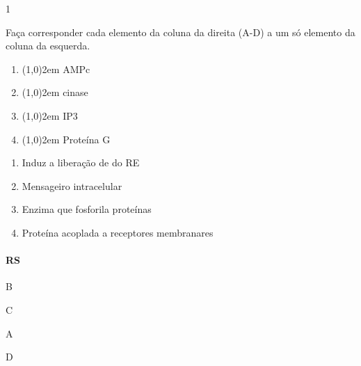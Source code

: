 \documentclass[\mainfilename]{subfiles}
\begin{document}
\begin{questionBox}1{} %
    
    Faça corresponder cada elemento da coluna da direita (A-D) a um só elemento da coluna da esquerda.

    \begin{multicols}{2}
       \begin{minipage}{.4\textwidth}
            \begin{enumerate}[label=(\roman{enumi})]
                \item \line(1,0){2em}{} AMPc
                \item \line(1,0){2em}{} cinase
                \item \line(1,0){2em}{} IP3
                \item \line(1,0){2em}{} Proteína G
            \end{enumerate}
       \end{minipage}
       \begin{minipage}{.5\textwidth}
            \begin{enumerate}[label=\Alph{enumi}:]
                \item Induz a liberação de  do RE
                \item Mensageiro intracelular
                \item Enzima que fosforila proteínas
                \item Proteína acoplada a receptores membranares
            \end{enumerate}
       \end{minipage}
    \end{multicols}

    \paragraph*{RS}
    \begin{minipage}{\textwidth}
        \begin{enumerate}[label=(\roman{enumi})]
            \begin{multicols}{4}
                \item B
                \item C
                \item A
                \item D
            \end{multicols}
        \end{enumerate}
    \end{minipage}
    
\end{questionBox}
\end{document}
